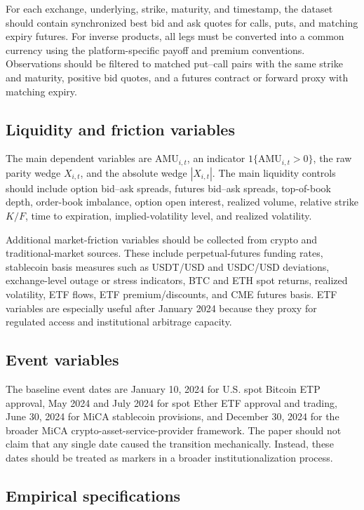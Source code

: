 \documentclass[12pt]{article}
\begin{document}
For each exchange, underlying, strike, maturity, and timestamp, the dataset should contain synchronized best bid and ask quotes for calls, puts, and matching expiry futures. For inverse products, all legs must be converted into a common currency using the platform-specific payoff and premium conventions. Observations should be filtered to matched put--call pairs with the same strike and maturity, positive bid quotes, and a futures contract or forward proxy with matching expiry.

\subsection{Liquidity and friction variables}

The main dependent variables are $\mathrm{AMU}_{i,t}$, an indicator $1\{\mathrm{AMU}_{i,t}>0\}$, the raw parity wedge $X_{i,t}$, and the absolute wedge $|X_{i,t}|$. The main liquidity controls should include option bid--ask spreads, futures bid--ask spreads, top-of-book depth, order-book imbalance, option open interest, realized volume, relative strike $K/F$, time to expiration, implied-volatility level, and realized volatility.

Additional market-friction variables should be collected from crypto and traditional-market sources. These include perpetual-futures funding rates, stablecoin basis measures such as USDT/USD and USDC/USD deviations, exchange-level outage or stress indicators, BTC and ETH spot returns, realized volatility, ETF flows, ETF premium/discounts, and CME futures basis. ETF variables are especially useful after January 2024 because they proxy for regulated access and institutional arbitrage capacity.

\subsection{Event variables}

The baseline event dates are January 10, 2024 for U.S. spot Bitcoin ETP approval, May 2024 and July 2024 for spot Ether ETF approval and trading, June 30, 2024 for MiCA stablecoin provisions, and December 30, 2024 for the broader MiCA crypto-asset-service-provider framework. The paper should not claim that any single date caused the transition mechanically. Instead, these dates should be treated as markers in a broader institutionalization process.

\subsection{Empirical specifications}
\end{document}
